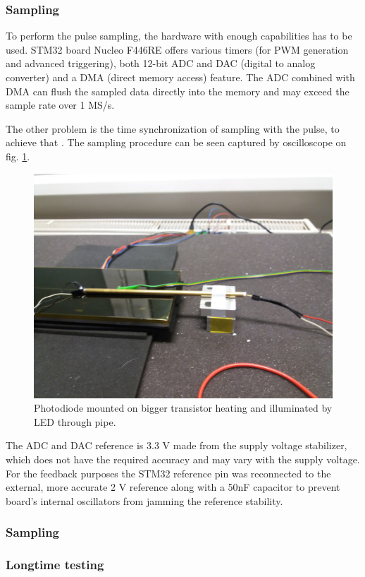 \subsubsection{Sampling}

To perform the pulse sampling, the hardware with enough capabilities has to be used. STM32 board Nucleo F446RE offers various timers (for PWM generation and advanced triggering), both 12-bit ADC and DAC (digital to analog converter) and a DMA (direct memory access) feature. The ADC combined with DMA can flush the sampled data directly into the memory and may exceed the sample rate over 1 MS/s.

\par

The other problem is the time synchronization of sampling with the pulse, to achieve that  . The sampling procedure can be seen captured by oscilloscope on fig. \ref{procedure}.



\begin{figure}[H]
 \centering
 \includegraphics[scale=0.08, angle=180]{./pictures/TempDestrc}
 \caption{Photodiode mounted on bigger transistor heating and illuminated by LED through pipe.}
 \label{procedure}
\end{figure}



\par

The ADC and DAC reference is 3.3 V made from the supply voltage stabilizer, which does not have the required accuracy and may vary with the supply voltage. For the feedback purposes the STM32 reference pin was reconnected to the external, more accurate 2 V reference along with a 50nF capacitor to prevent board's internal oscillators from jamming the reference stability.     




\subsubsection{Sampling}


\subsubsection{Longtime testing}




